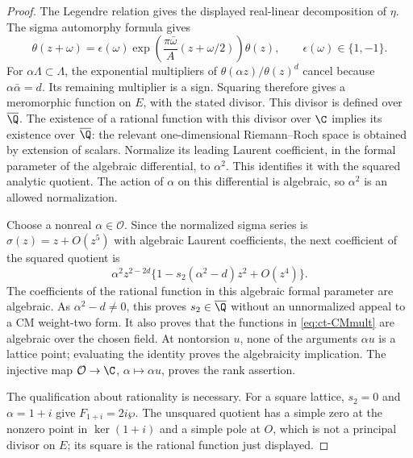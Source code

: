 \begin{proof}
The Legendre relation gives the displayed real-linear decomposition
of $\eta$. The sigma automorphy formula gives
\[
 \theta(z+\omega)=\epsilon(\omega)
  \exp\left(\frac{\pi\bar\omega}{A}
                         (z+\omega/2)\right)\theta(z),
 \qquad \epsilon(\omega)\in\{1,-1\}.
\]
For $\alpha\Lambda\subset\Lambda$, the exponential multipliers
of $\theta(\alpha z)/\theta(z)^d$ cancel because
$\alpha\bar\alpha=d$. Its remaining multiplier is a sign.
Squaring therefore gives a meromorphic function on $E$, with the
stated divisor. This divisor is defined over $\overline{\Q}$.
The existence of a rational function with this divisor over $\C$
implies its existence over $\overline{\Q}$: the relevant
one-dimensional Riemann--Roch space is obtained by extension of
scalars. Normalize its leading Laurent coefficient, in the formal
parameter of the algebraic differential, to $\alpha^2$. This
identifies it with the squared analytic quotient. The action of
$\alpha$ on this differential is algebraic, so $\alpha^2$ is an
allowed normalization.

Choose a nonreal $\alpha\in\mathcal O$. Since the normalized
sigma series is $\sigma(z)=z+O(z^5)$ with algebraic Laurent
coefficients, the next coefficient of the squared quotient is
\[
 \alpha^2z^{2-2d}
       \{1-s_2(\alpha^2-d)z^2+O(z^4)\}.
\]
The coefficients of the rational function in this algebraic formal
parameter are algebraic. As $\alpha^2-d\ne0$, this proves
$s_2\in\overline{\Q}$ without an unnormalized appeal to a CM
weight-two form. It also proves that the functions in
\eqref{eq:ct-CMmult} are algebraic over the chosen field.
At nontorsion $u$, none of the arguments $\alpha u$ is a lattice
point; evaluating the identity proves the algebraicity implication.
The injective map $\mathcal O\to\C$, $\alpha\mapsto\alpha u$,
proves the rank assertion.

The qualification about rationality is necessary. For a square
lattice, $s_2=0$ and $\alpha=1+i$ give
$F_{1+i}=2i\wp$. The unsquared quotient has a simple zero at
the nonzero point in $\ker(1+i)$ and a simple pole at $O$,
which is not a principal divisor on $E$; its square is the
rational function just displayed.
\end{proof}

